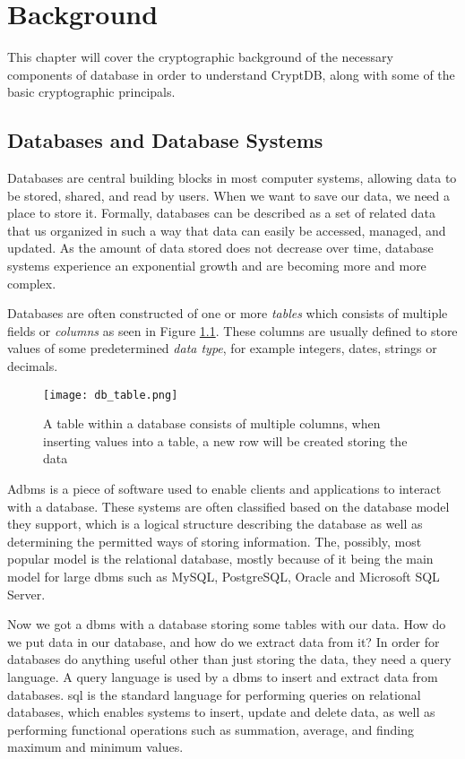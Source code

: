 \chapter{Background}
\label{chp:background}

This chapter will cover the cryptographic background of the necessary components of database in order to understand CryptDB, along with some of the basic cryptographic principals.

\section{Databases and Database Systems}

Databases are central building blocks in most computer systems, allowing data to be stored, shared, and read by users. When we want to save our data, we need a place to store it. Formally, databases can be described as a set of related data that us organized in such a way that data can easily be accessed, managed, and updated. As the amount of data stored does not decrease over time, database systems experience an exponential growth and are becoming more and more complex.

Databases are often constructed of one or more \emph{tables} which consists of multiple fields or \emph{columns} as seen in Figure \ref{fig:db_table}. These columns are usually defined to store values of some predetermined \emph{data type}, for example integers, dates, strings or decimals. 

\begin{figure}[h]
	\centering
	\texttt{[image: db\_table.png]}
	\caption{A table within a database consists of multiple columns, when inserting values into a table, a new row will be created storing the data}
	\label{fig:db_table}
\end{figure}

A\gls{dbms} is a piece of software used to enable clients and applications to interact with a database. These systems are often classified based on the database model they support, which is a logical structure describing the database as well as determining the permitted ways of storing information. The, possibly, most popular model is the relational database, mostly because of it being the main model for large \gls{dbms} such as MySQL, PostgreSQL, Oracle and Microsoft SQL Server.

Now we got a \gls{dbms} with a database storing some tables with our data. How do we put data in our database, and how do we extract data from it? In order for databases do anything useful other than just storing the data, they need a query language. A query language is used by a \gls{dbms} to insert and extract data from databases. \gls{sql} is the standard language for performing queries on relational databases, which enables systems to insert, update and delete data, as well as performing functional operations such as summation, average, and finding maximum and minimum values.

